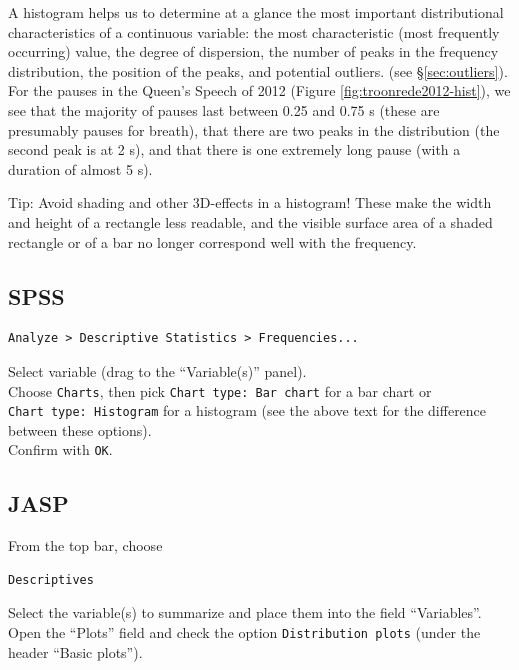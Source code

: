 \documentclass[
]{book}
\begin{document}
A histogram helps us to determine at a glance the most important distributional characteristics
of a continuous variable: the most characteristic
(most frequently occurring) value, the degree of dispersion, the
number of peaks in the frequency distribution, the position of the peaks,
and potential outliers.
(see §\ref{sec:outliers}).
For the pauses in the Queen's Speech of 2012
(Figure \ref{fig:troonrede2012-hist}), we see that the majority of pauses
last between 0.25 and 0.75 s (these are presumably pauses for breath),
that there are two peaks in the distribution (the second peak is at 2 s),
and that there is one extremely long pause (with a duration
of almost 5 s).

Tip: Avoid shading and other 3D-effects in a histogram! These
make the width and height of a rectangle less readable,
and the visible surface area of a shaded rectangle or of a bar
no longer correspond well with the frequency.

\hypertarget{spss-2}{%
\subsection{SPSS}\label{spss-2}}

\begin{verbatim}
Analyze > Descriptive Statistics > Frequencies...
\end{verbatim}

Select variable (drag to the ``Variable(s)'' panel).\\
Choose \texttt{Charts}, then pick \texttt{Chart\ type:\ Bar\ chart} for a
bar chart or \texttt{Chart\ type:\ Histogram} for a histogram (see
the above text for the difference between these options).\\
Confirm with \texttt{OK}.\\

\hypertarget{jasp-2}{%
\subsection{JASP}\label{jasp-2}}

From the top bar, choose

\begin{verbatim}
Descriptives
\end{verbatim}

Select the variable(s) to summarize and place them into the field ``Variables''. Open the ``Plots'' field and check the option \texttt{Distribution\ plots} (under the header ``Basic plots'').
\end{document}
